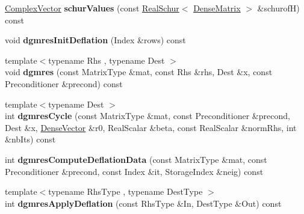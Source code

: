 \begin{DoxyCompactItemize}
\item 
\mbox{\label{class_eigen_1_1_d_g_m_r_e_s_af412c5002e13e06a689a809996c28954}} 
\hyperlink{group___core___module_class_eigen_1_1_matrix}{Complex\+Vector} {\bfseries schur\+Values} (const \hyperlink{group___eigenvalues___module_class_eigen_1_1_real_schur}{Real\+Schur}$<$ \hyperlink{group___core___module}{Dense\+Matrix} $>$ \&schurofH) const
\item 
\mbox{\label{class_eigen_1_1_d_g_m_r_e_s_a505c49553b8df373734e1a02e1c5ca70}} 
void {\bfseries dgmres\+Init\+Deflation} (Index \&rows) const
\item 
\mbox{\label{class_eigen_1_1_d_g_m_r_e_s_a1b06062ec16932d3a20ea4767d9de51d}} 
{\footnotesize template$<$typename Rhs , typename Dest $>$ }\\void {\bfseries dgmres} (const Matrix\+Type \&mat, const Rhs \&rhs, Dest \&x, const Preconditioner \&precond) const
\item 
\mbox{\label{class_eigen_1_1_d_g_m_r_e_s_a151b188720b20e13e8e6b112a8bcc167}} 
{\footnotesize template$<$typename Dest $>$ }\\int {\bfseries dgmres\+Cycle} (const Matrix\+Type \&mat, const Preconditioner \&precond, Dest \&x, \hyperlink{group___core___module}{Dense\+Vector} \&r0, Real\+Scalar \&beta, const Real\+Scalar \&norm\+Rhs, int \&nb\+Its) const
\item 
\mbox{\label{class_eigen_1_1_d_g_m_r_e_s_a36699b7bd6b1aa852e132c04697124e2}} 
int {\bfseries dgmres\+Compute\+Deflation\+Data} (const Matrix\+Type \&mat, const Preconditioner \&precond, const Index \&it, Storage\+Index \&neig) const
\item 
\mbox{\label{class_eigen_1_1_d_g_m_r_e_s_a7d61cd7c5f5d4f47714d124cc3c192c3}} 
{\footnotesize template$<$typename Rhs\+Type , typename Dest\+Type $>$ }\\int {\bfseries dgmres\+Apply\+Deflation} (const Rhs\+Type \&In, Dest\+Type \&Out) const
\item 
\mbox{\label{class_eigen_1_1_d_g_m_r_e_s_a8096f45fc4d68d9cb26a2cdef133bbd6}} 

\end{DoxyCompactItemize}
